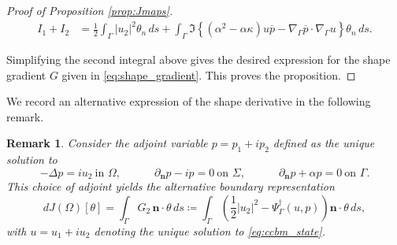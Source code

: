 \documentclass[a4paper,11pt]{article}
\newtheorem{remark}{Remark}
\newcommand{\vect}[1]{\boldsymbol{\mathbf{#1}}}
\newcommand{\tannabla}{\nabla_{\varGamma}}
\newcommand{\ur}{u_{1}}
\newcommand{\ui}{u_{2}}
\newcommand{\vr}{p_{1}}
\newcommand{\vi}{p_{2}}
\newcommand{\GG}{G} %
\newcommand{\VV}{\theta}
\newcommand{\Vn}{\theta_{n}}
\newcommand{\nn}{\vect{n}}
\newcommand{\dn}[1]{\partial_{\nn}{#1}}
\newcommand{\intG}[1]{\int_{\varGamma}{#1}{\, {d}{s}}}
\begin{document}
\begin{proof}[Proof of Proposition \ref{prop:Jmaps}]
	\begin{align*}
	I_{1} + I_{2}
	& = \frac12 \intG{ |\ui|^{2} \Vn } + \intG{\Im\left\{ (\alpha^2-\alpha \kappa)u\overline{p}-\tannabla \overline{{p}} \cdot \tannabla {u} \right\} \Vn}.
	\end{align*}
	
	Simplifying the second integral above gives the desired expression for the shape gradient $G$ given in \eqref{eq:shape_gradient}.
	This proves the proposition.
%
\end{proof} 
%
%
% 
We record an alternative expression of the shape derivative in the following remark.
%
\begin{remark}
	\label{rem:Jmaps}
	Consider the adjoint variable $p = \vr + i \vi$ defined as the unique solution to
	\begin{equation}\label{eq:adjoint_system_Re}
		-\Delta p 		=i\ui \ \text{in $\varOmega$},\qquad\quad
		\dn{p} - i p 	=0 \ \text{on $\varSigma$},\qquad\quad
		\dn{p} + \alpha p=0 \ \text{on $\varGamma$}.
	\end{equation}
	This choice of adjoint yields the alternative boundary representation
	\begin{equation}
	\label{eq:GG_correct}
	{d}J(\varOmega)[\VV] 
	= \intG{\GG_2 \, \nn \cdot \VV}
	\coloneqq \intG{ \left( \frac12 |\ui|^2  -  \Psi^{\dagger}_{\varGamma}(u,p) \right) \nn \cdot \VV},
	\end{equation}
	with $u = \ur + i \ui$ denoting the unique solution to \eqref{eq:ccbm_state}.
\end{remark}
%
%
\end{document}
